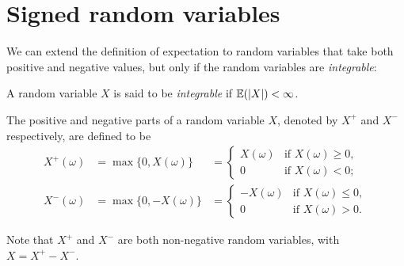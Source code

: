 %
%
%
%


\newpage
\section{Signed random variables}\label{sec:expe_signed}

We can extend the definition of expectation to random variables that take both positive and negative values, but only if the random variables are \emph{integrable}:

\begin{definition}
A random variable $X$ is said to be \emph{integrable} if $\mathbb{E}(|X|) < \infty$.
\end{definition}

\begin{definition}
The positive and negative parts of a random variable $X$, denoted by $X^{+}$ and $X^{-}$ respectively, are defined to be
\[\begin{array}{lll}
X^{+}(\omega) 
	& = \max\{0,X(\omega)\}	
	& = \begin{cases} 
			X(\omega)	& \text{if } X(\omega)\geq 0, \\
	   		0 		 	& \text{if } X(\omega) < 0;
	\end{cases} \\
X^{-}(\omega)	
	& = \max\{0,-X(\omega)\} 
	& = \begin{cases} 
			-X(\omega)	& \text{if } X(\omega)\leq 0, \\
			0 		 	& \text{if } X(\omega) > 0.
		\end{cases}
\end{array}\]
\end{definition}
Note that $X^{+}$ and $X^{-}$ are both non-negative random variables, with $X = X^{+} - X^{-}$.

